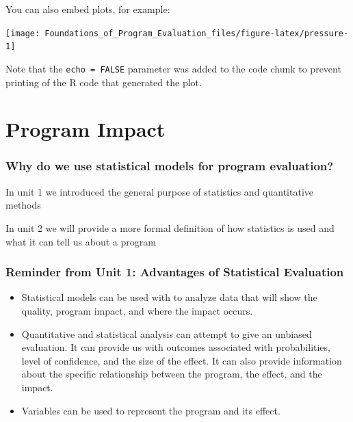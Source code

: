 \documentclass[]{book}
\providecommand{\tightlist}{%
  \setlength{\itemsep}{0pt}\setlength{\parskip}{0pt}}
\theoremstyle{definition}
\theoremstyle{definition}
\theoremstyle{definition}
\theoremstyle{remark}
\begin{document}
You can also embed plots, for example:

\begin{center}\texttt{[image: Foundations\_of\_Program\_Evaluation\_files/figure-latex/pressure-1]} \end{center}

Note that the \texttt{echo\ =\ FALSE} parameter was added to the code
chunk to prevent printing of the R code that generated the plot.

\hypertarget{program-impact}{%
\chapter{Program Impact}\label{program-impact}}

\hypertarget{why-do-we-use-statistical-models-for-program-evaluation}{%
\subsection{Why do we use statistical models for program
evaluation?}\label{why-do-we-use-statistical-models-for-program-evaluation}}

In unit 1 we introduced the general purpose of statistics and
quantitative methods

In unit 2 we will provide a more formal definition of how statistics is
used and what it can tell us about a program

\hypertarget{reminder-from-unit-1-advantages-of-statistical-evaluation}{%
\subsection{Reminder from Unit 1: Advantages of Statistical
Evaluation}\label{reminder-from-unit-1-advantages-of-statistical-evaluation}}

\begin{itemize}
\tightlist
\item
  Statistical models can be used with to analyze data that will show the
  quality, program impact, and where the impact occurs.
\item
  Quantitative and statistical analysis can attempt to give an unbiased
  evaluation. It can provide us with outcomes associated with
  probabilities, level of confidence, and the size of the effect. It can
  also provide information about the specific relationship between the
  program, the effect, and the impact.
\item
  Variables can be used to represent the program and its effect.
\end{itemize}
\end{document}
